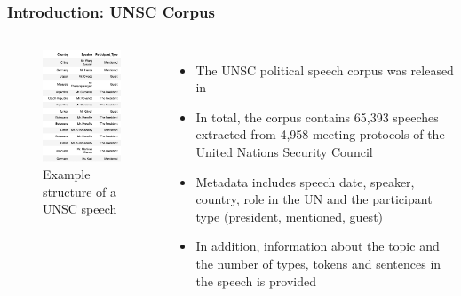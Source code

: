 \documentclass{beamer}
\begin{document}
	\subsection{}
	\begin{framefont}{\footnotesize}
		\begin{frame}
			\frametitle{Introduction: UNSC Corpus}
			\vspace{-10pt}
			\begin{columns}
				\centering
				\begin{figure}
					\captionsetup{justification=centering}
					\includegraphics[trim={0.7cm 0cm 0.2cm 0.2cm},clip,width=4.4cm]{overview_dataset.png}
					\caption{Example structure of a UNSC speech}
				\end{figure}
				\begin{itemize}
					\setlength\itemsep{1.5em}
					\item The UNSC political speech corpus was released in \citet{schnfeld2019security}
					\item In total, the corpus contains 65,393 speeches extracted from 4,958 meeting protocols of the United Nations Security Council
					\item Metadata includes speech date, speaker, country, role in the UN and the participant type (president, mentioned, guest)
					\item In addition, information about the topic and the number of types, tokens and sentences in the speech is provided
				\end{itemize}
			\end{columns}
		\end{frame}
	\end{framefont}
\end{document}
